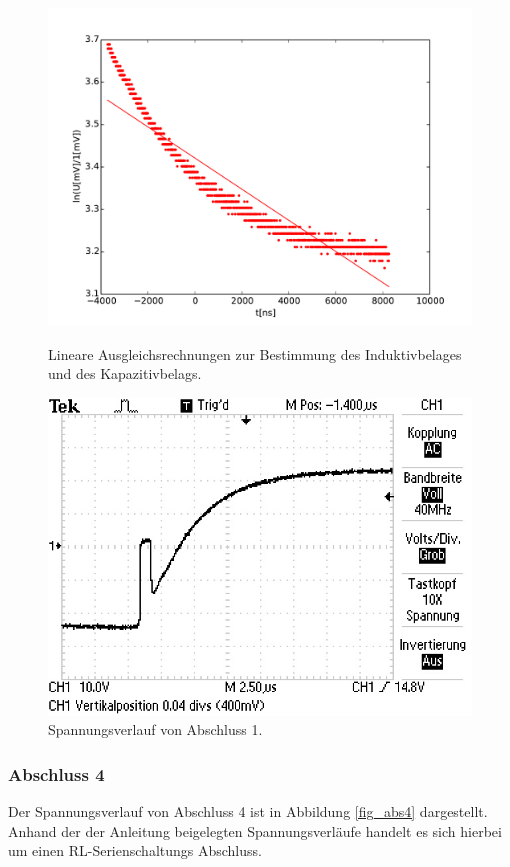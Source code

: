 \begin{figure}
	\centering
	\includegraphics[width = 14cm]{data/d/Regression1.pdf}
	\caption{Lineare Ausgleichsrechnungen zur Bestimmung des Induktivbelages und des Kapazitivbelags.}
	\includegraphics[width = 12cm]{data/d/F0004TEK.JPG}
	\caption{Spannungsverlauf von Abschluss 1.}
	\label{fig_abs1}
\end{figure}

\subsubsection{Abschluss 4} %
\label{sub:abschluss_4}

Der Spannungsverlauf von Abschluss 4 ist in Abbildung \ref{fig_abs4} dargestellt.
Anhand der der Anleitung beigelegten Spannungsverläufe handelt es sich hierbei um einen RL-Serien\-schaltungs Abschluss.

